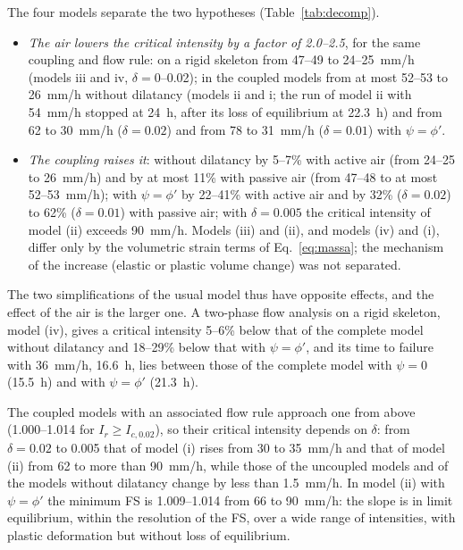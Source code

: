 The four models separate the two hypotheses (Table~\ref{tab:decomp}).
\begin{itemize}
\item \emph{The air lowers the critical intensity by a factor of 2.0--2.5}, for the same coupling and flow rule: on a
rigid skeleton from 47--49 to 24--25~mm/h (models iii and iv, $\delta=0$--0.02); in the coupled models from at most
52--53 to 26~mm/h without dilatancy (models ii and i; the run of model ii with 54~mm/h stopped at 24~h, after its loss
of equilibrium at 22.3~h) and from 62 to 30~mm/h ($\delta=0.02$) and from 78 to 31~mm/h ($\delta=0.01$) with
$\psi=\phi'$.
\item \emph{The coupling raises it}: without dilatancy by 5--7\% with active air (from 24--25 to 26~mm/h) and by at
most 11\% with passive air (from 47--48 to at most 52--53~mm/h); with $\psi=\phi'$ by 22--41\% with active air and by 32\% ($\delta=0.02$)
to 62\% ($\delta=0.01$) with passive air; with $\delta=0.005$ the critical intensity of model (ii) exceeds 90~mm/h.
Models (iii) and (ii), and models (iv) and (i), differ only by the volumetric strain terms of Eq.~\eqref{eq:massa};
the mechanism of the increase (elastic or plastic volume change) was not separated.
\end{itemize}
The two simplifications of the usual model thus have opposite effects, and the effect of the air is the larger one.
A two-phase flow analysis on a rigid skeleton, model (iv), gives a critical intensity 5--6\% below that of the complete
model without dilatancy and 18--29\% below that with $\psi=\phi'$, and its time to failure with 36~mm/h, 16.6~h, lies
between those of the complete model with $\psi=0$ (15.5~h) and with $\psi=\phi'$ (21.3~h).

The coupled models with an associated flow rule approach one from above (1.000--1.014 for $I_r\ge I_{c,0.02}$), so
their critical intensity depends on $\delta$: from $\delta=0.02$ to 0.005 that of model (i) rises from 30 to 35~mm/h
and that of model (ii) from 62 to more than 90~mm/h, while those of the uncoupled models and of the models without
dilatancy change by less than 1.5~mm/h. In model (ii) with $\psi=\phi'$ the minimum FS is 1.009--1.014 from 66 to
90~mm/h: the slope is in limit equilibrium, within the resolution of the FS, over a wide range of intensities, with
plastic deformation but without loss of equilibrium.

